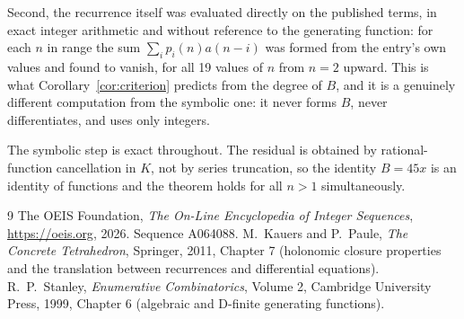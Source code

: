 \documentclass[11pt,a4paper]{article}
\theoremstyle{plain}
\theoremstyle{definition}
\begin{document}
Second, the recurrence itself was evaluated directly on the published terms, in exact
integer arithmetic and without reference to the generating function: for each $n$ in range
the sum $\sum_{i}p_{i}(n)a(n-i)$ was formed from the entry's own values and found to
vanish, for all 19 values of $n$ from $n=2$ upward. This is what
Corollary~\ref{cor:criterion} predicts from the degree of $B$, and it is a genuinely
different computation from the symbolic one: it never forms $B$, never differentiates, and
uses only integers.

The symbolic step is exact throughout. The residual is obtained by rational-function
cancellation in $K$, not by series truncation, so the identity $B=45 x$ is an
identity of functions and the theorem holds for all $n>1$ simultaneously.

\begin{thebibliography}{9}
 The OEIS Foundation, \emph{The On-Line Encyclopedia of Integer Sequences},
\url{https://oeis.org}, 2026. Sequence A064088.
 M.~Kauers and P.~Paule, \emph{The Concrete Tetrahedron}, Springer, 2011,
Chapter 7 (holonomic closure properties and the translation between recurrences and
differential equations).
 R.~P.~Stanley, \emph{Enumerative Combinatorics}, Volume 2, Cambridge
University Press, 1999, Chapter 6 (algebraic and D-finite generating functions).
\end{thebibliography}
\end{document}

